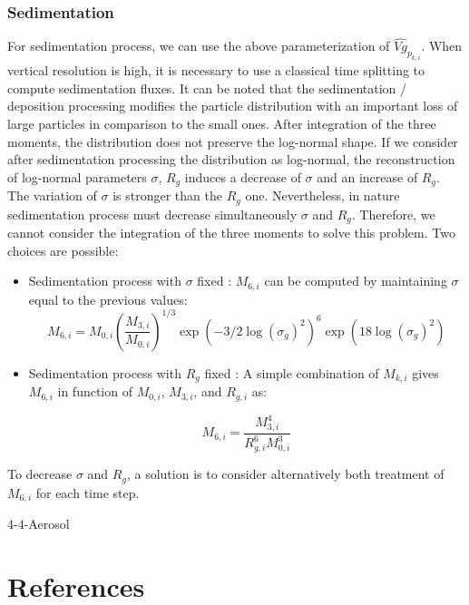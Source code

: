 \subsubsection*{Sedimentation}
For sedimentation process, we can use the above parameterization of 
$\hat{Vg}_{p_{k,i}}$. When
vertical resolution is high, it is necessary to use 
a classical time splitting to compute sedimentation fluxes.
It can be noted that the sedimentation / deposition processing modifies the 
particle distribution
with  an important loss of large particles in comparison to the small ones. 
After integration 
of the three moments, the distribution does not preserve the log-normal shape. 
If we consider after 
sedimentation processing the distribution as log-normal, the  
reconstruction of
log-normal parameters $\sigma$, $R_g$ induces a decrease of $\sigma$ and an 
increase of $R_g$. 
The variation of $\sigma$ is stronger than the $R_g$ one. Nevertheless, in nature
sedimentation process must decrease simultaneously  $\sigma$ and $R_g$.
 Therefore, we cannot consider the integration of the 
three moments to solve this problem. Two choices are possible:\\
\begin{itemize}
\item Sedimentation process with $\sigma$ fixed :
$M_{6,i}$ can be computed by maintaining $\sigma$ equal to the previous values:
\begin{equation}
M_{6,i} = M_{0,i} \left(\frac{M_{3,i}}{M_{0,i}} \right)^{1/3}  \exp \left( -3/2 
\log(\sigma_g)^2\right)^6  \exp\left(18 \log(\sigma_g)^2\right)
\label{sigmafix}
\end{equation}

\item Sedimentation process with $R_g$ fixed :
A simple combination of $M_{k,i}$ gives $M_{6,i}$ in function of $M_{0,i}$, 
$M_{3,i}$, and $R_{g,i}$ as:

\begin{equation}
M_{6,i} = \frac{M_{3,i}^4}{R_{g,i}^6 M_{0,i}^3}
\label{rgfix}
\end{equation}

\end{itemize}

To decrease $\sigma$ and $R_g$, a solution is to consider alternatively
both treatment of $M_{6,i}$ for each time step.


%

\begin{btSect}{4-4-Aerosol}
\section{References}
\btPrintCited
\end{btSect}
